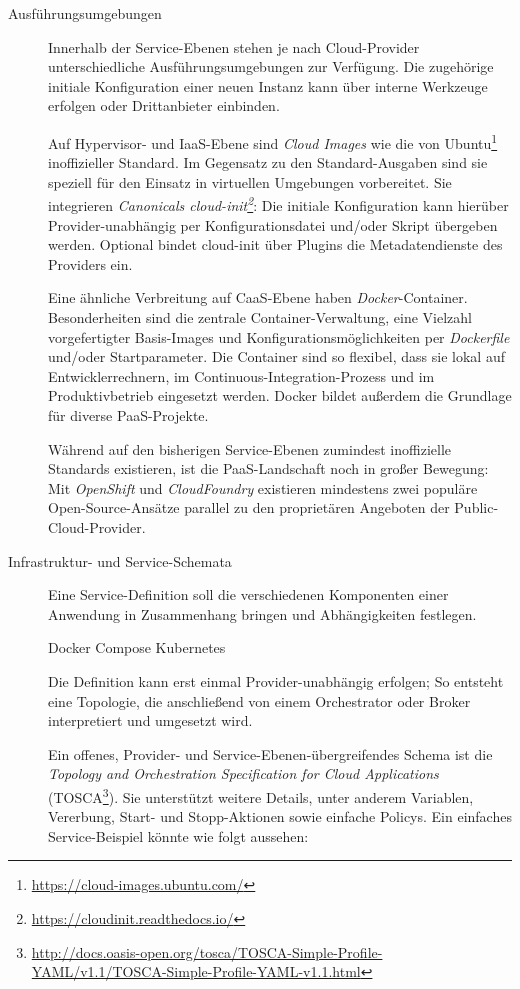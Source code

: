 \begin{description}
	
	\item[Ausführungsumgebungen] Innerhalb der Service-Ebenen stehen je nach Cloud-Provider unterschiedliche Ausführungsumgebungen zur Verfügung. Die zugehörige initiale Konfiguration einer neuen Instanz kann über interne Werkzeuge erfolgen oder Drittanbieter einbinden.
	
	Auf Hypervisor- und IaaS-Ebene sind \emph{Cloud Images} wie die von Ubuntu\footnote{\url{https://cloud-images.ubuntu.com/}} inoffizieller Standard. Im Gegensatz zu den Standard-Ausgaben sind sie speziell für den Einsatz in virtuellen Umgebungen vorbereitet. Sie integrieren \emph{Canonicals cloud-init\footnote{\url{https://cloudinit.readthedocs.io/}}}: Die initiale Konfiguration kann hierüber Provider-unabhängig per Konfigurationsdatei und/oder Skript übergeben werden. Optional bindet cloud-init über Plugins die Metadatendienste des Providers ein.
	
	Eine ähnliche Verbreitung auf CaaS-Ebene haben \emph{Docker}-Container. Besonderheiten sind die zentrale Container-Verwaltung, eine Vielzahl vorgefertigter Basis-Images und Konfigurationsmöglichkeiten per \emph{Dockerfile} und/oder Startparameter. Die Container sind so flexibel, dass sie lokal auf Entwicklerrechnern, im Continuous-Integration-Prozess und im Produktivbetrieb eingesetzt werden. Docker bildet außerdem die Grundlage für diverse PaaS-Projekte.
	
	Während auf den bisherigen Service-Ebenen zumindest inoffizielle Standards existieren, ist die PaaS-Landschaft noch in großer Bewegung: Mit \emph{Open\-Shift} und \emph{Cloud\-Foundry} existieren mindestens zwei populäre Open-Source-Ansätze parallel zu den proprietären Angeboten der Public-Cloud-Provider.
	
	\item[Infrastruktur- und Service-Schemata] Eine Service-Definition soll die verschiedenen Komponenten einer Anwendung in Zusammenhang bringen und Abhängigkeiten festlegen. 
	
	Docker Compose Kubernetes
	
	Die Definition kann erst einmal Provider-unabhängig erfolgen; So entsteht eine Topologie, die anschließend von einem Orchestrator oder Broker interpretiert und umgesetzt wird.
	
	Ein offenes, Provider- und Service-Ebenen-übergreifendes Schema ist die \emph{Topology and Orchestration Specification for Cloud Applications} (TOSCA\footnote{\url{http://docs.oasis-open.org/tosca/TOSCA-Simple-Profile-YAML/v1.1/TOSCA-Simple-Profile-YAML-v1.1.html}}). Sie unterstützt	weitere Details, unter anderem Variablen, Vererbung, Start- und Stopp-Aktionen sowie einfache Policys. Ein einfaches Service-Beispiel könnte wie folgt aussehen:
	

\end{description}
